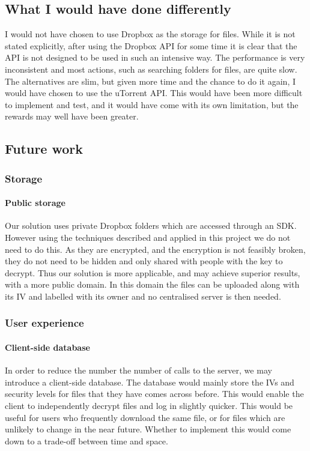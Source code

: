 \documentclass[12pt, titlepage]{article}
\begin{document}
\subsection{What I would have done differently}
I would not have chosen to use Dropbox as the storage for files. While it is not stated explicitly, after using the Dropbox API for some time it is clear that the API is not designed to be used in such an intensive way. The performance is very inconsistent and most actions, such as searching folders for files, are quite slow.
\newline \indent The alternatives are slim, but given more time and the chance to do it again, I would have chosen to use the uTorrent API. This would have been more difficult to implement and test, and it would have come with its own limitation, but the rewards may well have been greater.

\subsection{Future work}
\subsubsection*{Storage}
\paragraph*{Public storage} Our solution uses private Dropbox folders which are accessed through an SDK. However using the techniques described and applied in this project we do not need to do this. As they are encrypted, and the encryption is not feasibly broken, they do not need to be hidden and only shared with people with the key to decrypt. Thus our solution is more applicable, and may achieve superior results, with a more public domain. In this domain the files can be uploaded along with its IV and labelled with its owner and no centralised server is then needed.
\subsubsection*{User experience}
\paragraph*{Client-side database} In order to reduce the number the number of calls to the server, we may introduce a client-side database. The database would mainly store the IVs and security levels for files that they have comes across before. This would enable the client to independently decrypt files and log in slightly quicker. This would be useful for users who frequently download the same file, or for files which are unlikely to change in the near future. Whether to implement this would come down to a trade-off between time and space.
\end{document}
